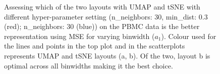 \documentclass[
  12pt]{article}
\begin{document}
\begin{figure}[H]


\caption{\label{fig-pbmc-mse-umap}Assessing which of the two layouts
with UMAP and tSNE with different hyper-parameter setting (n\_neighbors:
\(30\), min\_dist: \(0.3\) (red); n\_neighbors: \(30\) (blue)) on the
PBMC data is the better representation using MSE for varying binwidth
(\(a_1\)). Colour used for the lines and points in the top plot and in
the scatterplots represents UMAP and tSNE layouts (a, b). Of the two,
layout b is optimal across all binwidths making it the best choice.}

\end{figure}%
\end{document}

